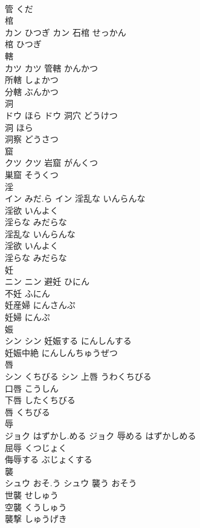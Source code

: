 \documentclass[8pt]{extreport}
\begin{document}
\begin{CJK}{UTF8}{min}
\\	管	くだ	
\\	棺	
\\	カン	ひつぎ	カン	石棺	せっかん	
\\	棺	ひつぎ	
\\	轄	
\\	カツ		カツ	管轄	かんかつ	
\\	所轄	しょかつ	
\\	分轄	ぶんかつ	
\\	洞	
\\	ドウ	ほら	ドウ	洞穴	どうけつ	
\\	洞	ほら	
\\	洞察	どうさつ	
\\	窟	
\\	クツ		クツ													岩窟	がんくつ	
\\	巣窟	そうくつ	
\\	淫	
\\	イン	みだ.ら	イン	淫乱な	いんらんな	
\\	淫欲	いんよく	
\\	淫らな	みだらな	
\\	淫乱な	いんらんな	
\\	淫欲	いんよく	
\\	淫らな	みだらな	
\\	妊	
\\	ニン		ニン	避妊	ひにん	
\\	不妊	ふにん	
\\	妊産婦	にんさんぷ	
\\	妊婦	にんぷ	
\\	娠	
\\	シン		シン	妊娠する	にんしんする	
\\	妊娠中絶	にんしんちゅうぜつ	
\\	唇	
\\	シン	くちびる	シン	上唇	うわくちびる	
\\	口唇	こうしん	
\\	下唇	したくちびる	
\\	唇	くちびる	
\\	辱	
\\	ジョク	はずかし.める	ジョク	辱める	はずかしめる	
\\	屈辱	くつじょく	
\\	侮辱する	ぶじょくする	
\\	襲	
\\	シュウ	おそ.う	シュウ	襲う	おそう	
\\	世襲	せしゅう	
\\	空襲	くうしゅう	
\\	襲撃	しゅうげき	

\end{CJK}
\end{document}
